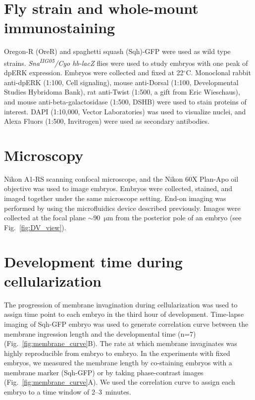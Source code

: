 \documentclass{pnastwo}
\newcommand{\fig}[0]{Fig.}
\begin{document}
\begin{article}
\begin{materials}

\section{Fly strain and whole-mount immunostaining}
%
Oregon-R (OreR) and spaghetti squash (Sqh)-GFP were used as wild type strains. 
%
{\it Sna\textsuperscript{\it IIG05}/Cyo hb-lacZ} flies were used to study embryos with one peak of dpERK expression.  
%
Embryos were collected and fixed at 22$^\circ$C. 
%
Monoclonal rabbit anti-dpERK (1:100, Cell signaling), mouse anti-Dorsal (1:100, Developmental Studies Hybridoma Bank), rat anti-Twist (1:500, a gift from Eric Wieschaus), and mouse anti-beta-galactosidase (1:500, DSHB) were used to stain proteins of interest. DAPI (1:10,000, Vector Laboratories) was used to visualize nuclei, and Alexa Fluors (1:500, Invitrogen) were used as secondary antibodies. 

\section{Microscopy}
%
Nikon A1-RS scanning confocal microscope, and the Nikon 60X Plan-Apo oil objective was used to image embryos. Embryos were collected, stained, and imaged together under the same microscope setting. End-on imaging was performed by using the microfluidics device described previously. Images were collected at the focal plane $\sim$90~$\mathrm{\mu m}$ from the posterior pole of an embryo (see \fig~\ref{fig:DV_view}). 

\section{Development time during cellularization} 
%
The progression of membrane invagination during cellularization was used to assign time point to each embryo in the third hour of development. Time-lapse imaging of Sqh-GFP embryo was used to generate correlation curve between the membrane ingression length and the developmental time (n=7) (\fig~\ref{fig:membrane_curve}B). The rate at which membrane invaginates was highly reproducible from embryo to embryo. In the experiments with fixed embryos, we measured the membrane length by co-staining embryos with a membrane marker (Sqh-GFP) or by taking phase-contrast images (\fig~\ref{fig:membrane_curve}A). We used the correlation curve to assign each embryo to a time window of 2--3~minutes. 

\end{materials}



\end{article}
\end{document}
